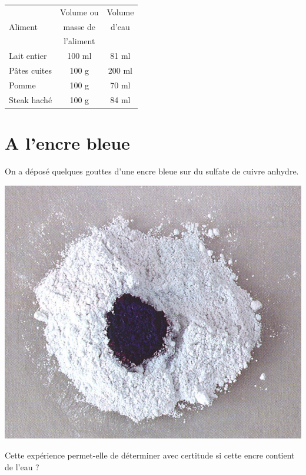 \documentclass[a4paper,11pt]{exam}
\begin{document}
\begin{center}
	\begin{tabular}{|l|c|c|}
		\hline
		& Volume ou & Volume \\ 
		Aliment      & masse de  & d'eau  \\ 
		& l'aliment &        \\ \hline
		Lait entier  & 100 ml    & 81 ml  \\ \hline
		Pâtes cuites & 100 g     & 200 ml \\ \hline
		Pomme        & 100 g     & 70 ml  \\ \hline
		Steak haché  & 100 g     & 84 ml  \\ \hline
	\end{tabular}
\end{center}

\newpage

\section{A l'encre bleue}

On a déposé quelques gouttes d'une encre bleue sur du sulfate de cuivre anhydre.

\begin{center}
	\includegraphics[scale=0.7]{encre}
\end{center}

\begin{questions}
	\question Cette expérience permet-elle de déterminer avec certitude si cette encre contient de l'eau ?
\end{questions}
\end{document}
